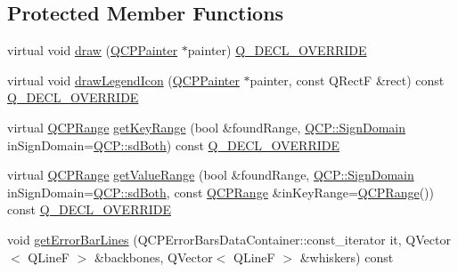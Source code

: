 \subsection*{Protected Member Functions}
\begin{DoxyCompactItemize}
\item 
virtual void \mbox{\hyperlink{class_q_c_p_error_bars_a801e85931372abf2a1034bfb2eac5cd2}{draw}} (\mbox{\hyperlink{class_q_c_p_painter}{Q\+C\+P\+Painter}} $\ast$painter) \mbox{\hyperlink{qcustomplot_8h_a42cc5eaeb25b85f8b52d2a4b94c56f55}{Q\+\_\+\+D\+E\+C\+L\+\_\+\+O\+V\+E\+R\+R\+I\+DE}}
\item 
virtual void \mbox{\hyperlink{class_q_c_p_error_bars_a20f5d292e66103f26bca00b11ce417b4}{draw\+Legend\+Icon}} (\mbox{\hyperlink{class_q_c_p_painter}{Q\+C\+P\+Painter}} $\ast$painter, const Q\+RectF \&rect) const \mbox{\hyperlink{qcustomplot_8h_a42cc5eaeb25b85f8b52d2a4b94c56f55}{Q\+\_\+\+D\+E\+C\+L\+\_\+\+O\+V\+E\+R\+R\+I\+DE}}
\item 
virtual \mbox{\hyperlink{class_q_c_p_range}{Q\+C\+P\+Range}} \mbox{\hyperlink{class_q_c_p_error_bars_a6cac828a430d66ac77a167549d01d212}{get\+Key\+Range}} (bool \&found\+Range, \mbox{\hyperlink{namespace_q_c_p_afd50e7cf431af385614987d8553ff8a9}{Q\+C\+P\+::\+Sign\+Domain}} in\+Sign\+Domain=\mbox{\hyperlink{namespace_q_c_p_afd50e7cf431af385614987d8553ff8a9aa38352ef02d51ddfa4399d9551566e24}{Q\+C\+P\+::sd\+Both}}) const \mbox{\hyperlink{qcustomplot_8h_a42cc5eaeb25b85f8b52d2a4b94c56f55}{Q\+\_\+\+D\+E\+C\+L\+\_\+\+O\+V\+E\+R\+R\+I\+DE}}
\item 
virtual \mbox{\hyperlink{class_q_c_p_range}{Q\+C\+P\+Range}} \mbox{\hyperlink{class_q_c_p_error_bars_ab76215a186ae4862235821e028685f26}{get\+Value\+Range}} (bool \&found\+Range, \mbox{\hyperlink{namespace_q_c_p_afd50e7cf431af385614987d8553ff8a9}{Q\+C\+P\+::\+Sign\+Domain}} in\+Sign\+Domain=\mbox{\hyperlink{namespace_q_c_p_afd50e7cf431af385614987d8553ff8a9aa38352ef02d51ddfa4399d9551566e24}{Q\+C\+P\+::sd\+Both}}, const \mbox{\hyperlink{class_q_c_p_range}{Q\+C\+P\+Range}} \&in\+Key\+Range=\mbox{\hyperlink{class_q_c_p_range}{Q\+C\+P\+Range}}()) const \mbox{\hyperlink{qcustomplot_8h_a42cc5eaeb25b85f8b52d2a4b94c56f55}{Q\+\_\+\+D\+E\+C\+L\+\_\+\+O\+V\+E\+R\+R\+I\+DE}}
\item 
void \mbox{\hyperlink{class_q_c_p_error_bars_abeea5ff0d66732bbfc9b74869d8c552e}{get\+Error\+Bar\+Lines}} (Q\+C\+P\+Error\+Bars\+Data\+Container\+::const\+\_\+iterator it, Q\+Vector$<$ Q\+LineF $>$ \&backbones, Q\+Vector$<$ Q\+LineF $>$ \&whiskers) const
\item 

\end{DoxyCompactItemize}

